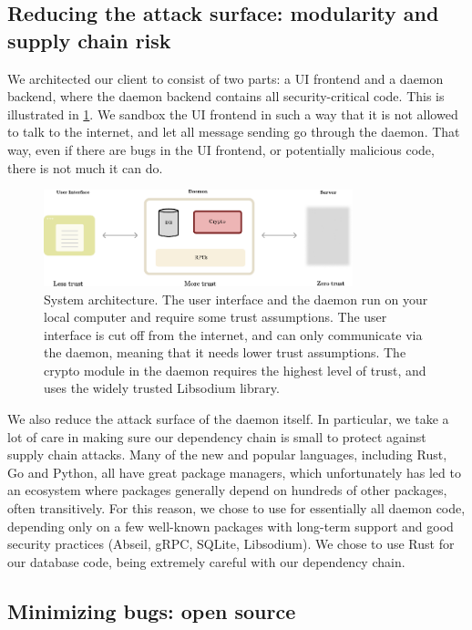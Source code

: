 \subsection{Reducing the attack surface: modularity and supply chain risk}

We architected our client to consist of two parts: a UI frontend and a daemon backend, where the daemon backend contains all security-critical code. This is illustrated in \cref{fig:systemdiagram}. We sandbox the UI frontend in such a way that it is not allowed to talk to the internet, and let all message sending go through the daemon. That way, even if there are bugs in the UI frontend, or potentially malicious code, there is not much it can do.

\begin{figure}
    \centering
    \includegraphics[width=0.8\textwidth]{systemdiagram.pdf}
\caption{System architecture. The user interface and the daemon run on your local computer and require some trust assumptions. The user interface is cut off from the internet, and can only communicate via the daemon, meaning that it needs lower trust assumptions. The crypto module in the daemon requires the highest level of trust, and uses the widely trusted Libsodium library.}
\label{fig:systemdiagram}
\end{figure}

We also reduce the attack surface of the daemon itself. In particular, we take a lot of care in making sure our dependency chain is small to protect against supply chain attacks. Many of the new and popular languages, including Rust, Go and Python, all have great package managers, which unfortunately has led to an ecosystem where packages generally depend on hundreds of other packages, often transitively. For this reason, we chose to use \Cpp for essentially all daemon code, depending only on a few well-known packages with long-term support and good security practices (Abseil, gRPC, SQLite, Libsodium). We chose to use Rust for our database code, being extremely careful with our dependency chain.

\subsection{Minimizing bugs: open source}

